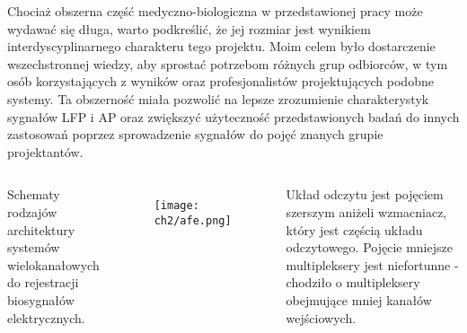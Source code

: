 \begin{frame}[t]
    \begin{block}{\dk}
    \end{block}
    Chociaż obszerna część medyczno-biologiczna w przedstawionej pracy może wydawać się długa, warto podkreślić, że jej rozmiar jest wynikiem interdyscyplinarnego charakteru tego projektu. 
    Moim celem było dostarczenie wszechstronnej wiedzy, aby sprostać potrzebom różnych grup odbiorców, w tym osób korzystających z wyników oraz profesjonalistów projektujących podobne systemy.
    Ta obszerność miała pozwolić na lepsze zrozumienie charakterystyk sygnałów LFP i AP oraz zwiększyć użyteczność przedstawionych badań do innych zastosowań poprzez sprowadzenie sygnałów do pojęć znanych grupie projektantów.
\end{frame}

\begin{frame}[t]
    \begin{block}{\dk}
    \end{block}

    \begin{columns}

        Schematy rodzajów architektury systemów wielokanałowych do rejestracji biosygnałów elektrycznych.
        \begin{figure}[H]
            \texttt{[image: ch2/afe.png]}
        \end{figure}

    
        Układ odczytu jest pojęciem szerszym aniżeli wzmacniacz, który jest częścią układu odczytowego.
        Pojęcie mniejsze multipleksery jest niefortunne - chodziło o multipleksery obejmujące mniej kanałów wejściowych.
 

    \end{columns}
    
\end{frame}

